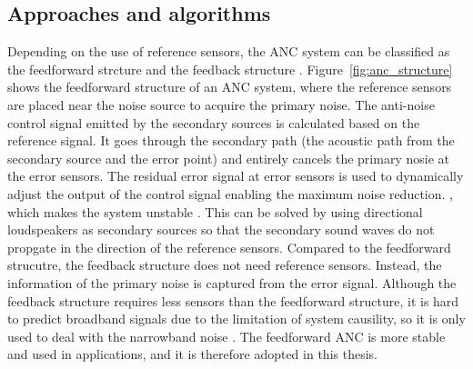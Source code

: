 \subsection{Approaches and algorithms}
\label{sec:anc_algorithm}
{
Depending on the use of reference sensors, the ANC system can be classified as the feedforward strcture and the feedback structure \cite{Elliott2000SignalProcessingActive}. 
Figure~\ref{fig:anc_structure} shows the feedforward structure of an ANC system, where the reference sensors are placed near the noise source to acquire the primary noise.
The anti-noise control signal emitted by the secondary sources is calculated based on the reference signal.
It goes through the secondary path (the acoustic path from the secondary source and the error point) and entirely cancels the primary nosie at the error sensors.
The residual error signal at error sensors is used to dynamically adjust the output of the control signal enabling the maximum noise reduction. 
, which makes the system unstable \cite{Akhtar2007ActiveNoiseControl}.
This can be solved by using directional loudspeakers as secondary sources so that the secondary sound waves do not propgate in the direction of the reference sensors.
Compared to the feedforward strucutre, the feedback structure does not need reference sensors. 
Instead, the information of the primary noise is captured from the error signal.
Although the feedback structure requires less sensors than the feedforward structure, 
it is hard to predict broadband signals due to the limitation of system causility, so it is only used to deal with the narrowband noise \cite{Elliott2000SignalProcessingActive}.
The feedforward ANC is more stable and used in applications, and it is therefore adopted in this thesis.
}

